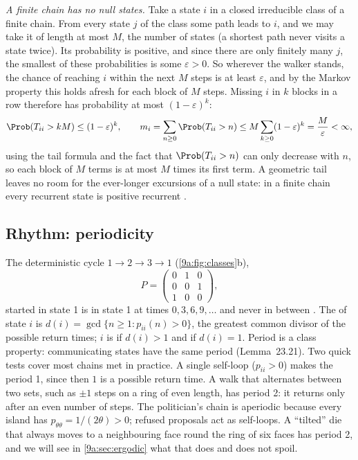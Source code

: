 \emph{A finite chain has no null states.} Take a state $i$ in a closed irreducible class of a
finite chain. From every state $j$ of the class some path leads to $i$, and we may take it of
length at most $M$, the number of states (a shortest path never visits a state twice). Its
probability is positive, and since there are only finitely many $j$, the smallest of these
probabilities is some $\varepsilon>0$. So wherever the walker stands, the chance of reaching $i$
within the next $M$ steps is at least $\varepsilon$, and by the Markov property this holds
afresh for each block of $M$ steps. Missing $i$ in $k$ blocks in a row therefore has probability
at most $(1-\varepsilon)^k$:
\begin{equation*}
  \Prob(T_{ii}>kM)\le(1-\varepsilon)^k,
  \qquad
  m_i=\sum_{n\ge0}\Prob(T_{ii}>n)\le M\sum_{k\ge0}(1-\varepsilon)^k=\frac{M}{\varepsilon}<\infty,
\end{equation*}
using the tail formula and the fact that $\Prob(T_{ii}>n)$ can only decrease with $n$, so each
block of $M$ terms is at most $M$ times its first term. A geometric tail leaves no room for the
ever-longer excursions of a null state: in a finite chain every recurrent state is positive
recurrent .

\subsection{Rhythm: periodicity}
\label{9a:sec:period}

The deterministic cycle $1\to2\to3\to1$ (\cref{9a:fig:classes}b),
\begin{equation*}
  P=\begin{pmatrix}0&1&0\\0&0&1\\1&0&0\end{pmatrix},
\end{equation*}
started in state 1 is in state 1 at times $0,3,6,9,\dots$ and never in between
. The  of state $i$ is
$d(i)=\gcd\{n\ge1:p_{ii}(n)>0\}$, the greatest common divisor of the possible return times; $i$
is  if $d(i)>1$ and  if $d(i)=1$. Period is a class
property: communicating states have the same period (Lemma~23.21). Two quick tests cover most
chains met in practice. A single self-loop ($p_{ii}>0$) makes the period 1, since then $1$ is a
possible return time. A walk that alternates between two sets, such as $\pm1$ steps on a ring of
even length, has period 2: it returns only after an even number of steps. The politician's
chain is aperiodic because every island has $p_{\theta\theta}=1/(2\theta)>0$; refused
proposals act as self-loops. A ``tilted'' die that always moves to a neighbouring face round the
ring of six faces  has period 2, and we will see in
\cref{9a:sec:ergodic} what that does and does not spoil.

